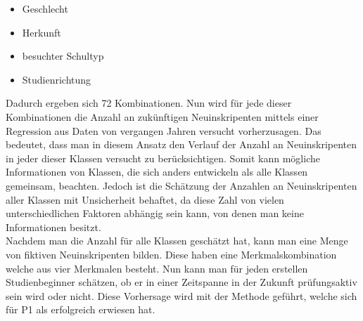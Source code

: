 \begin{itemize}
  \item Geschlecht
  \item Herkunft
  \item besuchter Schultyp
  \item Studienrichtung
\end{itemize}

Dadurch ergeben sich 72 Kombinationen. Nun wird f\"ur jede dieser Kombinationen die Anzahl an zuk\"unftigen Neuinskripenten mittels einer Regression aus Daten von
vergangen Jahren versucht vorherzusagen. Das bedeutet, dass man in diesem Ansatz den Verlauf der Anzahl an Neuinskripenten in jeder dieser Klassen versucht zu
ber\"ucksichtigen. Somit kann m\"ogliche Informationen von Klassen, die sich anders entwickeln als alle Klassen gemeinsam, beachten. Jedoch ist die Sch\"atzung der
Anzahlen an Neuinskripenten aller Klassen mit Unsicherheit behaftet, da diese Zahl von vielen unterschiedlichen Faktoren abh\"angig sein kann, 
von denen man keine Informationen besitzt. \\

Nachdem man die Anzahl f\"ur alle Klassen gesch\"atzt hat, kann man eine Menge von fiktiven Neuinskripenten bilden. Diese haben eine Merkmalskombination
welche aus vier Merkmalen besteht. Nun kann man f\"ur jeden erstellen Studienbeginner sch\"atzen, ob er in einer Zeitspanne in der Zukunft pr\"ufungsaktiv sein wird oder nicht.
Diese Vorhersage wird mit der Methode gef\"uhrt, welche sich f\"ur P1 als erfolgreich erwiesen hat.